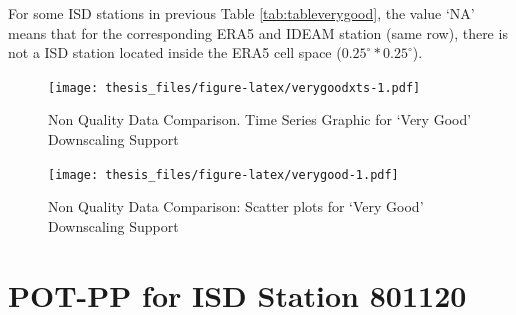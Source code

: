 \documentclass[12pt,oneside]{reedthesis}
\begin{document}
For some ISD stations in previous Table \ref{tab:tableverygood}, the value `NA' means that for the corresponding ERA5 and IDEAM station (same row), there is not a ISD station located inside the ERA5 cell space (\(0.25^\circ * 0.25^\circ\)).
\begin{figure}
\centering
\texttt{[image: thesis\_files/figure-latex/verygoodxts-1.pdf]}
\caption{\label{fig:verygoodxts}Non Quality Data Comparison. Time Series Graphic for `Very Good' Downscaling Support}
\end{figure}
\begin{figure}
\centering
\texttt{[image: thesis\_files/figure-latex/verygood-1.pdf]}
\caption{\label{fig:verygood}Non Quality Data Comparison: Scatter plots for `Very Good' Downscaling Support}
\end{figure}
\hypertarget{pot-pp-for-isd-station-801120}{%
\section{POT-PP for ISD Station 801120}\label{pot-pp-for-isd-station-801120}}
\end{document}
